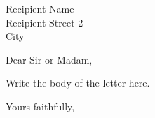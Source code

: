 \documentclass{letter}
\date{{date}}
\begin{document}
\begin{letter}{Recipient Name \\ Recipient Street 2 \\ City}

\opening{Dear Sir or Madam,}

Write the body of the letter here.

\closing{Yours faithfully,}

\end{letter}
\end{document}
